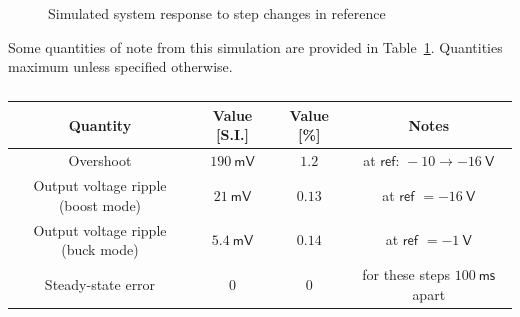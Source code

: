 \begin{figure}[H]
    \centering
    \caption{Simulated system response to step changes in reference}
    \label{fig:simulation_pulsetrain}
\end{figure}
Some quantities of note from this simulation are provided in Table~\ref{tab:simulation_step}. Quantities maximum unless specified otherwise.
\begin{table}[H]
    \centering
    \begin{tabular}{|c|c|c|c|}
    \hline
    Quantity & Value [S.I.] & Value [\%] & Notes\\
    \hline
    Overshoot & $190 \ \mathsf{mV}$ & $1.2$ & at $\textsf{ref: } \minus 10 \rightarrow \minus 16 \ \mathsf{V}$\\
    \hline
    Output voltage ripple (boost mode) & $21 \ \mathsf{mV}$ & $0.13$ & at $\textsf{ref } = \minus 16 \ \mathsf{V}$\\
    \hline
    Output voltage ripple (buck mode) & $5.4 \ \mathsf{mV}$ & $0.14$ & at $\textsf{ref } = \minus 1 \ \mathsf{V}$\\
    \hline
    Steady-state error & $0$ & $0$ & for these steps $100 \ \mathsf{ms}$ apart\\
    \hline
    \end{tabular}
    \caption{}
    \label{tab:simulation_step}
\end{table}
